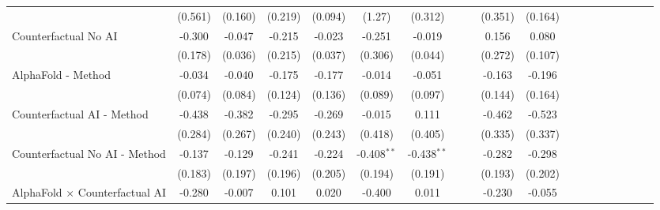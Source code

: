 \begin{tabular}{lcccccccccccccccccc}
                                                              & (0.561) & (0.160) & (0.219) & (0.094) & (1.27)        & (0.312)       &       &       & (0.351)       & (0.164)       &       &       &      &      &      &      &      &   \\   
   Counterfactual No AI                                       & -0.300  & -0.047  & -0.215  & -0.023  & -0.251        & -0.019        &       &       & 0.156         & 0.080         &       &       &      &      &      &      &      &   \\   
                                                              & (0.178) & (0.036) & (0.215) & (0.037) & (0.306)       & (0.044)       &       &       & (0.272)       & (0.107)       &       &       &      &      &      &      &      &   \\   
   AlphaFold - Method                                         & -0.034  & -0.040  & -0.175  & -0.177  & -0.014        & -0.051        &       &       & -0.163        & -0.196        &       &       &      &      &      &      &      &   \\   
                                                              & (0.074) & (0.084) & (0.124) & (0.136) & (0.089)       & (0.097)       &       &       & (0.144)       & (0.164)       &       &       &      &      &      &      &      &   \\   
   Counterfactual AI - Method                                 & -0.438  & -0.382  & -0.295  & -0.269  & -0.015        & 0.111         &       &       & -0.462        & -0.523        &       &       &      &      &      &      &      &   \\   
                                                              & (0.284) & (0.267) & (0.240) & (0.243) & (0.418)       & (0.405)       &       &       & (0.335)       & (0.337)       &       &       &      &      &      &      &      &   \\   
   Counterfactual No AI - Method                              & -0.137  & -0.129  & -0.241  & -0.224  & -0.408$^{**}$ & -0.438$^{**}$ &       &       & -0.282        & -0.298        &       &       &      &      &      &      &      &   \\   
                                                              & (0.183) & (0.197) & (0.196) & (0.205) & (0.194)       & (0.191)       &       &       & (0.193)       & (0.202)       &       &       &      &      &      &      &      &   \\   
   AlphaFold $\times$ Counterfactual AI                       & -0.280  & -0.007  & 0.101   & 0.020   & -0.400        & 0.011         &       &       & -0.230        & -0.055        &       &       &      &      &      &      &      &   \\   

\end{tabular}
